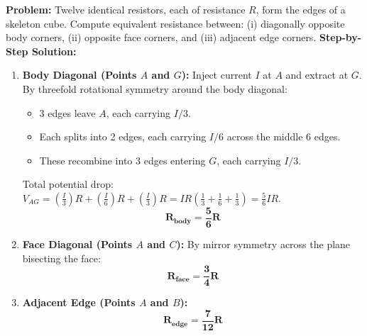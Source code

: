 \documentclass[10pt,a4paper]{article}
\begin{document}
\begin{usecasebox}
\textbf{Problem:} Twelve identical resistors, each of resistance $R$, form the edges of a skeleton cube. Compute equivalent resistance between: (i) diagonally opposite body corners, (ii) opposite face corners, and (iii) adjacent edge corners.
\textbf{Step-by-Step Solution:}
\begin{enumerate}
  \item \textbf{Body Diagonal (Points $A$ and $G$):}
  Inject current $I$ at $A$ and extract at $G$. By threefold rotational symmetry around the body diagonal:
  \begin{itemize}
    \item 3 edges leave $A$, each carrying $I/3$.
    \item Each splits into 2 edges, each carrying $I/6$ across the middle 6 edges.
    \item These recombine into 3 edges entering $G$, each carrying $I/3$.
  \end{itemize}
  Total potential drop: $V_{AG} = \left(\frac{I}{3}\right)R + \left(\frac{I}{6}\right)R + \left(\frac{I}{3}\right)R = I R \left(\frac{1}{3} + \frac{1}{6} + \frac{1}{3}\right) = \frac{5}{6} I R$.
  \begin{equation}
    \mathbf{R_{\text{body}} = \frac{5}{6} R}
  \end{equation}
  \item \textbf{Face Diagonal (Points $A$ and $C$):}
  By mirror symmetry across the plane bisecting the face:
  \begin{equation}
    \mathbf{R_{\text{face}} = \frac{3}{4} R}
  \end{equation}
  \item \textbf{Adjacent Edge (Points $A$ and $B$):}
  \begin{equation}
    \mathbf{R_{\text{edge}} = \frac{7}{12} R}
  \end{equation}
\end{enumerate}
\end{usecasebox}
\end{document}
